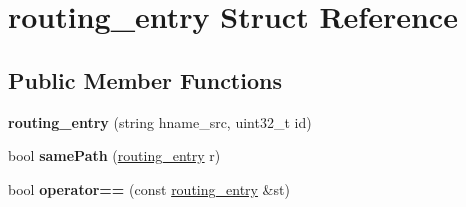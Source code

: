 \hypertarget{structrouting__entry}{\section{routing\-\_\-entry Struct Reference}
\label{structrouting__entry}
}
\subsection*{Public Member Functions}
\begin{DoxyCompactItemize}
\item 
\hypertarget{structrouting__entry_a3b336fc641f1e1676c50291e00c91803}{{\bfseries routing\-\_\-entry} (string hname\-\_\-src, uint32\-\_\-t id)}\label{structrouting__entry_a3b336fc641f1e1676c50291e00c91803}

\item 
\hypertarget{structrouting__entry_a761b7e9e6dcfb91df4332b4deda24345}{bool {\bfseries same\-Path} (\hyperlink{structrouting__entry}{routing\-\_\-entry} r)}\label{structrouting__entry_a761b7e9e6dcfb91df4332b4deda24345}

\item 
\hypertarget{structrouting__entry_a769cebc3f8735380c7f3bda9a3de8395}{bool {\bfseries operator==} (const \hyperlink{structrouting__entry}{routing\-\_\-entry} \&st)}\label{structrouting__entry_a769cebc3f8735380c7f3bda9a3de8395}

\end{DoxyCompactItemize}
